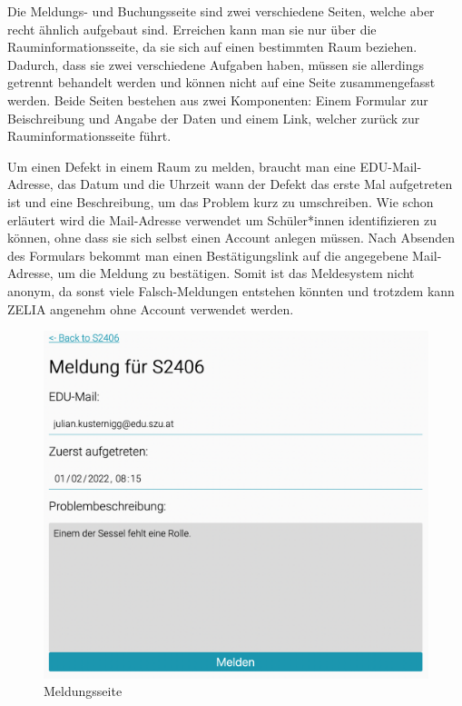 
Die Meldungs- und Buchungsseite sind zwei verschiedene Seiten, welche aber recht ähnlich aufgebaut sind. Erreichen kann man sie nur über die Rauminformationsseite, da sie sich auf einen bestimmten Raum beziehen. Dadurch, dass sie zwei verschiedene Aufgaben haben, müssen sie allerdings getrennt behandelt werden und können nicht auf eine Seite zusammengefasst werden. Beide Seiten bestehen aus zwei Komponenten: Einem Formular zur Beischreibung und Angabe der Daten und einem Link, welcher zurück zur Rauminformationsseite führt.
  

Um einen Defekt in einem Raum zu melden, braucht man eine EDU-Mail-Adresse, das Datum und die Uhrzeit wann der Defekt das erste Mal aufgetreten ist und eine Beschreibung, um das Problem kurz zu umschreiben. Wie schon erläutert wird die Mail-Adresse verwendet um Schüler*innen identifizieren zu können, ohne dass sie sich selbst einen Account anlegen müssen. Nach Absenden des Formulars bekommt man einen Bestätigungslink auf die angegebene Mail-Adresse, um die Meldung zu bestätigen. Somit ist das Meldesystem nicht anonym, da sonst viele Falsch-Meldungen entstehen könnten und trotzdem kann ZELIA angenehm ohne Account verwendet werden. 

\begin{figure}[H]
    \centering
    \includegraphics[width=120mm]{media/WebComponents/Meldungsseite_light.png}
    \caption{Meldungsseite}
\end{figure}

